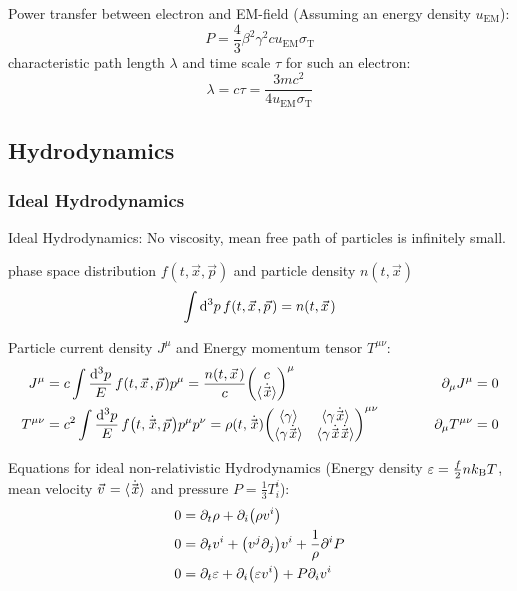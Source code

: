 			Power transfer between electron and EM-field (Assuming an energy density $u_\text{EM}$):
			\begin{equation}
				P = \frac{4}{3} \beta^2 \gamma^2 c u_\text{EM} \sigma_\text{T}
			\end{equation}
			characteristic path length $\lambda$ and time scale $\tau$ for such an electron:
			\begin{equation}
				\lambda = c\tau = \frac{3 m c^2}{4 u_\text{EM} \sigma_\text{T}}
			\end{equation}



	\subsection{Hydrodynamics}
		\subsubsection{Ideal Hydrodynamics}
			Ideal Hydrodynamics: No viscosity, mean free path of particles is infinitely small.

			\noindent
			phase space distribution $f(t, \vec{x},\vec{p})$ and particle density $n(t,\vec{x})$
			\begin{equation}
				\int \dd^3 p\, f\qty(t, \vec{x}, \vec{p}) = n\qty(t,\vec{x})
			\end{equation}

			\noindent
			Particle current density $J^\mu$ and Energy momentum tensor $T^{\mu\nu}$:
			\begin{equation}
				\begin{aligned}
					J^{\mu} &= c \int \frac{\dd^3 p}{E}\, f\qty(t, \vec{x}, \vec{p}) p^{\mu} = \frac{n(t, \vec{x})}{c} \mqty(c\\\avg{\dot{\vec{x}}})^\mu
					&\hsp
					\partial_\mu J^{\mu} &= 0 \\
					T^{\mu\nu} &= c^2 \int \frac{\dd^3 p}{E}\, f\qty(t, \dot{\vec{x}}, \vec{p}) p^{\mu} p^{\nu} =\rho(t, \dot{\vec{x}})\mqty(\avg{\gamma} & \avg{\gamma \dot{\vec{x}}} \\ \avg{\gamma \dot{\vec{x}}} & \avg{\gamma\dot{\vec{x}}\dot{\vec{x}}})^{\mu\nu}
					&\hsp
					\partial_\mu T^{\mu\nu} &= 0 \\
				\end{aligned}
			\end{equation}

			\noindent
			Equations for ideal non-relativistic Hydrodynamics (Energy density $\varepsilon=\frac{f}{2} n k_{\text{B}} T$, mean velocity $\vec{v}=\avg{\dot{\vec{x}}}$ and pressure $P = \frac{1}{3} T^{i}_i$):
			\begin{equation}
				\begin{aligned}
					0 &= \partial_t \rho + \partial_i \qty(\rho v^i) \\
					0 &= \partial_t v^i + \qty(v^j \partial_j) v^i + \frac{1}{\rho} \partial^i P \\
					0 &= \partial_t \varepsilon + \partial_i \qty(\varepsilon v^i) + P \partial_i v^i  \\
				\end{aligned}
			\end{equation}

